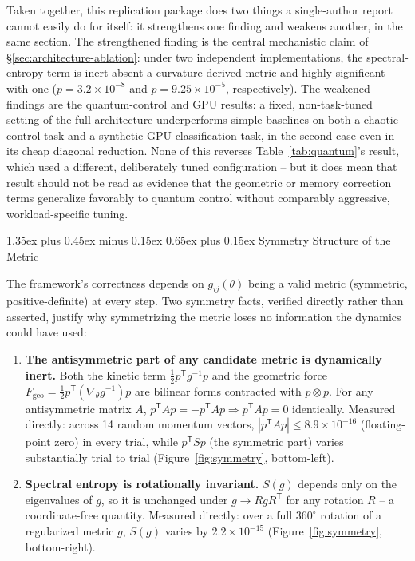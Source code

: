 \documentclass[10pt,twocolumn]{article}
\makeatletter
\renewcommand\section{\@startsection{section}{1}{0pt}%
  {1.35ex plus 0.45ex minus 0.15ex}%
  {0.65ex plus 0.15ex}%
  {\large\bfseries}}
\makeatother
\begin{document}
Taken together, this replication package does two things a single-author
report cannot easily do for itself: it strengthens one finding and weakens
another, in the same section. The strengthened finding is the central
mechanistic claim of \S\ref{sec:architecture-ablation}: under two
independent implementations, the spectral-entropy term is inert absent a
curvature-derived metric and highly significant with one
($p=3.2\times10^{-8}$ and $p=9.25\times10^{-5}$, respectively). The weakened
findings are the quantum-control and GPU results: a fixed, non-task-tuned
setting of the full architecture underperforms simple baselines on both a
chaotic-control task and a synthetic GPU classification task, in the second
case even in its cheap diagonal reduction. None of this reverses
Table~\ref{tab:quantum}'s result, which used a different, deliberately tuned
configuration -- but it does mean that result should not be read as evidence
that the geometric or memory correction terms generalize favorably to
quantum control without comparably aggressive, workload-specific tuning.

\section{Symmetry Structure of the Metric}

The framework's correctness depends on $g_{ij}(\theta)$ being a valid
metric (symmetric, positive-definite) at every step. Two symmetry facts,
verified directly rather than asserted, justify why symmetrizing the metric
loses no information the dynamics could have used:

\begin{enumerate}
\item \textbf{The antisymmetric part of any candidate metric is dynamically
inert.} Both the kinetic term $\tfrac12 p^{\mathsf T} g^{-1} p$ and the
geometric force $F_{\mathrm{geo}} = \tfrac12 p^{\mathsf T}(\nabla_\theta g^{-1})p$
are bilinear forms contracted with $p\otimes p$. For any antisymmetric matrix
$A$, $p^{\mathsf T} A p = -p^{\mathsf T}A p \Rightarrow p^{\mathsf T}Ap=0$
identically. Measured directly: across 14 random momentum vectors, $|p^{\mathsf
T}Ap| \le 8.9\times10^{-16}$ (floating-point zero) in every trial, while
$p^{\mathsf T}Sp$ (the symmetric part) varies substantially trial to trial
(Figure~\ref{fig:symmetry}, bottom-left).
\item \textbf{Spectral entropy is rotationally invariant.} $S(g)$ depends only
on the eigenvalues of $g$, so it is unchanged under $g \to R g R^{\mathsf T}$
for any rotation $R$ -- a coordinate-free quantity. Measured directly: over a
full $360^\circ$ rotation of a regularized metric $g$, $S(g)$ varies by
$2.2\times10^{-15}$ (Figure~\ref{fig:symmetry}, bottom-right).
\end{enumerate}
\end{document}
